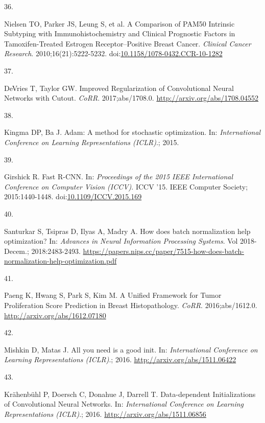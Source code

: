\documentclass[
  12pt,
  a5,margin=2cmpaper,
]{article}
\newlength{\cslhangindent}
\newlength{\csllabelwidth}
\newlength{\cslentryspacingunit} %
\newenvironment{CSLReferences}[2] %
 {%
  \setlength{\parindent}{0pt}
  \ifodd #1
  \let\oldpar\par
  \def\par{\hangindent=\cslhangindent\oldpar}
  \fi
  \setlength{\parskip}{#2\cslentryspacingunit}
 }%
 {}
\newcommand{\CSLLeftMargin}[1]{\parbox[t]{\csllabelwidth}{#1}}
\newcommand{\CSLRightInline}[1]{\parbox[t]{\linewidth - \csllabelwidth}{#1}\break}
\begin{document}
\begin{CSLReferences}{0}{0}
\leavevmode{}%
\CSLLeftMargin{36. }%
\CSLRightInline{Nielsen TO, Parker JS, Leung S, et al. {A Comparison of
PAM50 Intrinsic Subtyping with Immunohistochemistry and Clinical
Prognostic Factors in Tamoxifen-Treated Estrogen Receptor--Positive
Breast Cancer}. \emph{Clinical Cancer Research}. 2010;16(21):5222-5232.
doi:\href{https://doi.org/10.1158/1078-0432.CCR-10-1282}{10.1158/1078-0432.CCR-10-1282}}

\leavevmode{}%
\CSLLeftMargin{37. }%
\CSLRightInline{DeVries T, Taylor GW. {Improved Regularization of
Convolutional Neural Networks with Cutout}. \emph{CoRR}.
2017;abs/1708.0. \url{http://arxiv.org/abs/1708.04552}}

\leavevmode{}%
\CSLLeftMargin{38. }%
\CSLRightInline{Kingma DP, Ba J. {Adam: A method for stochastic
optimization}. In: \emph{International Conference on Learning
Representations (ICLR)}.; 2015.}

\leavevmode{}%
\CSLLeftMargin{39. }%
\CSLRightInline{Girshick R. {Fast R-CNN}. In: \emph{Proceedings of the
2015 IEEE International Conference on Computer Vision (ICCV)}. ICCV '15.
IEEE Computer Society; 2015:1440-1448.
doi:\href{https://doi.org/10.1109/ICCV.2015.169}{10.1109/ICCV.2015.169}}

\leavevmode{}%
\CSLLeftMargin{40. }%
\CSLRightInline{Santurkar S, Tsipras D, Ilyas A, Madry A. {How does
batch normalization help optimization?} In: \emph{Advances in Neural
Information Processing Systems}. Vol 2018-Decem.; 2018:2483-2493.
\url{https://papers.nips.cc/paper/7515-how-does-batch-normalization-help-optimization.pdf}}

\leavevmode{}%
\CSLLeftMargin{41. }%
\CSLRightInline{Paeng K, Hwang S, Park S, Kim M. {A Unified Framework
for Tumor Proliferation Score Prediction in Breast Histopathology}.
\emph{CoRR}. 2016;abs/1612.0. \url{http://arxiv.org/abs/1612.07180}}

\leavevmode{}%
\CSLLeftMargin{42. }%
\CSLRightInline{Mishkin D, Matas J. {All you need is a good init}. In:
\emph{International Conference on Learning Representations (ICLR)}.;
2016. \url{http://arxiv.org/abs/1511.06422}}

\leavevmode{}%
\CSLLeftMargin{43. }%
\CSLRightInline{Krähenbühl P, Doersch C, Donahue J, Darrell T.
{Data-dependent Initializations of Convolutional Neural Networks}. In:
\emph{International Conference on Learning Representations (ICLR)}.;
2016. \url{http://arxiv.org/abs/1511.06856}}


\end{CSLReferences}
\end{document}
